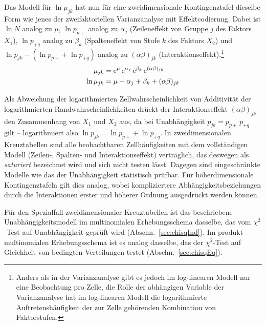 Das Modell für $\ln \mu_{jk}$ hat nun für eine zweidimensionale Kontingenztafel dieselbe Form wie jenes der zweifaktoriellen Varianzanalyse mit Effektcodierung. Dabei ist $\ln N$ analog zu $\mu$, $\ln p_{p+}$ analog zu $\alpha_{j}$ (Zeileneffekt von Gruppe $j$ des Faktors $X_{1}$), $\ln p_{+q}$ analog zu $\beta_{k}$ (Spalteneffekt von Stufe $k$ des Faktors $X_{2}$) und $\ln p_{jk} - (\ln p_{p+} + \ln p_{+q})$ analog zu $(\alpha \beta)_{jk}$ (Interaktionseffekt).\footnote{Anders als in der Varianzanalyse gibt es jedoch im log-linearen Modell nur eine Beobachtung pro Zelle, die Rolle der abhängigen Variable der Varianzanalyse hat im log-linearen Modell die logarithmierte Auftretenshäufigkeit der zur Zelle gehörenden Kombination von Faktorstufen.}
\begin{align*}
\mu_{jk} &= {\mathrm{e}}^{\mu} \, {\mathrm{e}}^{\alpha_{j}} \, {\mathrm{e}}^{\beta_{k}} \, {\mathrm{e}}^{(\alpha \beta)_{jk}}\\
\ln \mu_{jk}      &= \mu + \alpha_{j} + \beta_{k} + (\alpha \beta)_{jk}\\
\end{align*}

Als Abweichung der logarithmierten Zellwahrscheinlichkeit von Additivität der logarithmierten Randwahrscheinlichkeiten drückt der Interaktionseffekt $(\alpha \beta)_{jk}$ den Zusammenhang von $X_{1}$ und $X_{2}$ aus, da bei Unabhängigkeit $p_{jk} = p_{p+} \, p_{+q}$ gilt -- logarithmiert also $\ln p_{jk} = \ln p_{p+} + \ln p_{+q}$. In zweidimensionalen Kreuztabellen sind alle beobachtbaren Zellhäufigkeiten mit dem vollständigen Modell (Zeilen-, Spalten- und Interaktionseffekt) verträglich, das deswegen als \emph{saturiert} bezeichnet wird und sich nicht testen lässt. Dagegen sind eingeschränkte Modelle wie das der Unabhängigkeit statistisch prüfbar. Für höherdimensionale Kontingenztafeln gilt dies analog, wobei kompliziertere Abhängigkeitsbeziehungen durch die Interaktionen erster und höherer Ordnung ausgedrückt werden können.

Für den Spezialfall zweidimensionaler Kreuztabellen ist das beschriebene Unabhängigkeitsmodell im multinomialen Erhebungsschema dasselbe, das vom $\chi^{2}$-Test auf Unabhängigkeit geprüft wird (Abschn.\ \ref{sec:chisqInd}). Im produkt-multinomialen Erhebungsschema ist es analog dasselbe, das der $\chi^{2}$-Test auf Gleichheit von bedingten Verteilungen testet (Abschn.\ \ref{sec:chisqEq}).

